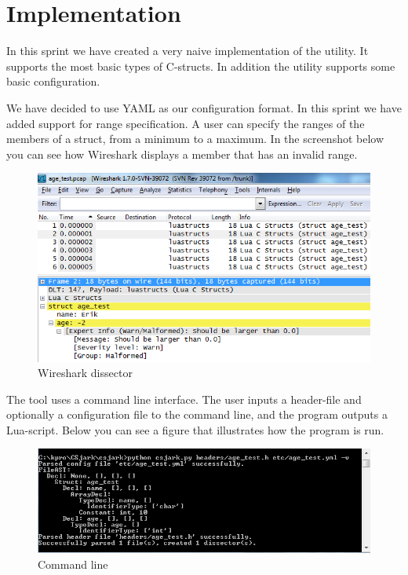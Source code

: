 \section{Implementation}
In this sprint we have created a very naive implementation of the utility. It supports the most basic types of C-structs. In addition the utility supports some basic configuration.

We have decided to use YAML as our configuration format. In this sprint we have added support for range specification.
A user can specify the ranges of the members of a struct, from a minimum to a maximum.
In the screenshot below you can see how Wireshark displays a member that has an invalid range. \newline
\begin{figure}[here]
\includegraphics[width=1.2\textwidth]{pics/wireshark_outofrange}
\caption{Wireshark dissector}
\label{fig:dissector_screenshot}
\end{figure}	

The tool uses a command line interface. The user inputs a header-file and optionally a configuration file to the command line, and the program outputs a Lua-script.  Below you can see a figure that illustrates how the program is run.
\begin{figure}[here]
\includegraphics[width=1.2\textwidth]{pics/cmd_agetest_run}
\caption{Command line}
\label{fig:cmd_screenshot}
\end{figure}

